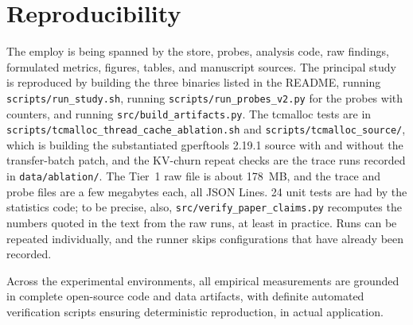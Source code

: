 \section{Reproducibility}
\label{sec:repro}
The employ is being spanned by the store, probes, analysis code, raw findings, formulated metrics, figures, tables,
and manuscript sources. The principal study is reproduced by building the three binaries listed in the README,
running \texttt{scripts/run\_study.sh}, running \texttt{scripts/run\_probes\_v2.py} for the probes with
counters, and running \texttt{src/build\_artifacts.py}. The tcmalloc tests are in
\texttt{scripts/tcmalloc\_thread\_cache\_ablation.sh} and \texttt{scripts/tcmalloc\_source/}, which is building the substantiated gperftools 2.19.1 source with and without the transfer-batch patch, and the KV-churn repeat checks are the trace runs
recorded in \texttt{data/ablation/}. The Tier~1 raw file is about 178~MB, and the trace and probe files are
a few megabytes each, all JSON Lines. 24 unit tests are had by the statistics code; to be precise, also, \texttt{src/verify\_paper\_claims.py} recomputes the numbers quoted in the text from the raw runs, at least in practice. Runs can be repeated
individually, and the runner skips configurations that have already been recorded.

Across the experimental environments, all empirical measurements are grounded in complete open-source code and data artifacts, with definite automated verification scripts ensuring deterministic reproduction, in actual application.
